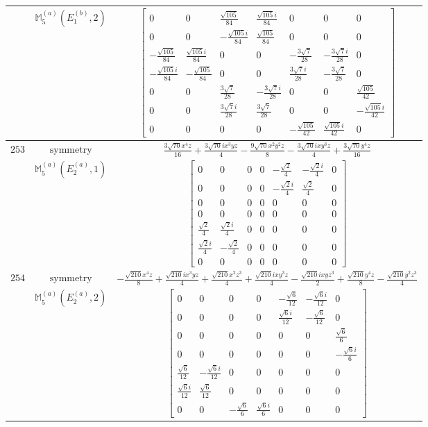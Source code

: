 \documentclass[fleqn,8pt,landscape]{jsarticle}
\begin{document}
\begin{longtable}{ccc}
$  $ & $ \mathbb{M}_{5}^{(a)}(E_{1}^{(b)},2) $ & $ \begin{bmatrix} 0 & 0 & \frac{\sqrt{105}}{84} & \frac{\sqrt{105} i}{84} & 0 & 0 & 0 \\ 0 & 0 & - \frac{\sqrt{105} i}{84} & \frac{\sqrt{105}}{84} & 0 & 0 & 0 \\ - \frac{\sqrt{105}}{84} & \frac{\sqrt{105} i}{84} & 0 & 0 & - \frac{3 \sqrt{7}}{28} & - \frac{3 \sqrt{7} i}{28} & 0 \\ - \frac{\sqrt{105} i}{84} & - \frac{\sqrt{105}}{84} & 0 & 0 & \frac{3 \sqrt{7} i}{28} & - \frac{3 \sqrt{7}}{28} & 0 \\ 0 & 0 & \frac{3 \sqrt{7}}{28} & - \frac{3 \sqrt{7} i}{28} & 0 & 0 & \frac{\sqrt{105}}{42} \\ 0 & 0 & \frac{3 \sqrt{7} i}{28} & \frac{3 \sqrt{7}}{28} & 0 & 0 & - \frac{\sqrt{105} i}{42} \\ 0 & 0 & 0 & 0 & - \frac{\sqrt{105}}{42} & \frac{\sqrt{105} i}{42} & 0 \end{bmatrix} $ \\ \hline
$ 253 $ & $ \text{symmetry} $ & $ \frac{3 \sqrt{70} x^{4} z}{16} + \frac{3 \sqrt{70} i x^{3} y z}{4} - \frac{9 \sqrt{70} x^{2} y^{2} z}{8} - \frac{3 \sqrt{70} i x y^{3} z}{4} + \frac{3 \sqrt{70} y^{4} z}{16} $ \\
$  $ & $ \mathbb{M}_{5}^{(a)}(E_{2}^{(a)},1) $ & $ \begin{bmatrix} 0 & 0 & 0 & 0 & - \frac{\sqrt{2}}{4} & - \frac{\sqrt{2} i}{4} & 0 \\ 0 & 0 & 0 & 0 & - \frac{\sqrt{2} i}{4} & \frac{\sqrt{2}}{4} & 0 \\ 0 & 0 & 0 & 0 & 0 & 0 & 0 \\ 0 & 0 & 0 & 0 & 0 & 0 & 0 \\ \frac{\sqrt{2}}{4} & \frac{\sqrt{2} i}{4} & 0 & 0 & 0 & 0 & 0 \\ \frac{\sqrt{2} i}{4} & - \frac{\sqrt{2}}{4} & 0 & 0 & 0 & 0 & 0 \\ 0 & 0 & 0 & 0 & 0 & 0 & 0 \end{bmatrix} $ \\ \hline
$ 254 $ & $ \text{symmetry} $ & $ - \frac{\sqrt{210} x^{4} z}{8} + \frac{\sqrt{210} i x^{3} y z}{4} + \frac{\sqrt{210} x^{2} z^{3}}{4} + \frac{\sqrt{210} i x y^{3} z}{4} - \frac{\sqrt{210} i x y z^{3}}{2} + \frac{\sqrt{210} y^{4} z}{8} - \frac{\sqrt{210} y^{2} z^{3}}{4} $ \\
$  $ & $ \mathbb{M}_{5}^{(a)}(E_{2}^{(a)},2) $ & $ \begin{bmatrix} 0 & 0 & 0 & 0 & - \frac{\sqrt{6}}{12} & - \frac{\sqrt{6} i}{12} & 0 \\ 0 & 0 & 0 & 0 & \frac{\sqrt{6} i}{12} & - \frac{\sqrt{6}}{12} & 0 \\ 0 & 0 & 0 & 0 & 0 & 0 & \frac{\sqrt{6}}{6} \\ 0 & 0 & 0 & 0 & 0 & 0 & - \frac{\sqrt{6} i}{6} \\ \frac{\sqrt{6}}{12} & - \frac{\sqrt{6} i}{12} & 0 & 0 & 0 & 0 & 0 \\ \frac{\sqrt{6} i}{12} & \frac{\sqrt{6}}{12} & 0 & 0 & 0 & 0 & 0 \\ 0 & 0 & - \frac{\sqrt{6}}{6} & \frac{\sqrt{6} i}{6} & 0 & 0 & 0 \end{bmatrix} $ \\ \hline

\end{longtable}
\end{document}
